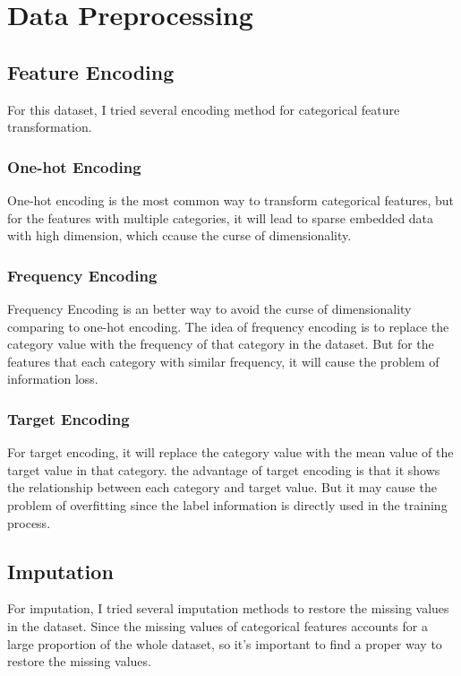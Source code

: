 \documentclass[a4paper, oneside, final, 12pt]{scrartcl} %
\begin{document}
\section{Data Preprocessing}

\subsection{Feature Encoding}

For this dataset, I tried several encoding method for categorical feature transformation.

\subsubsection{One-hot Encoding}

One-hot encoding is the most common way to transform categorical features,
but for the features with multiple categories, it will lead to sparse embedded data with high dimension,
which ccause the curse of dimensionality.

\subsubsection{Frequency Encoding}

Frequency Encoding is an better way to avoid the curse of dimensionality comparing to one-hot encoding.
The idea of frequency encoding is to replace the category value with the frequency of that category in the dataset.
But for the features that each category with similar frequency, it will cause the problem of information loss.

\subsubsection{Target Encoding}

For target encoding, it will replace the category value with the mean value of the target value in that category.
the advantage of target encoding is that it shows the relationship between each category and target value.
But it may cause the problem of overfitting since the label information is directly used in the training process.

\subsection{Imputation}

For imputation, I tried several imputation methods to restore the missing values in the dataset.
Since the missing values of categorical features accounts for a large proportion of the whole dataset,
so it's important to find a proper way to restore the missing values.
\end{document}
